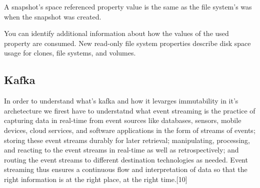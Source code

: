 \documentclass[12pt,twoside]{article}
\begin{document}
A snapshot's space referenced property value is the same as the file system's was when the snapshot was created.

You can identify additional information about how the values of the used property are consumed. New read-only file system properties describe disk space usage for clones, file systems, and volumes.


\subsection{Kafka}
In order to understand what's kafka and how it levarges immutability in it's archetecture we firest have to understatnd what event streaming is the practice of capturing data in real-time from event sources like databases, sensors, mobile devices, cloud services, and software applications in the form of streams of events; storing these event streams durably for later retrieval; manipulating, processing, and reacting to the event streams in real-time as well as retrospectively; and routing the event streams to different destination technologies as needed. Event streaming thus ensures a continuous flow and interpretation of data so that the right information is at the right place, at the right time.[10]
\end{document}
